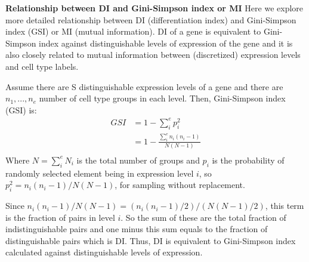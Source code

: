 \textbf{Relationship between DI and Gini-Simpson index or MI} 
Here we explore more detailed relationship between DI (differentiation index) and Gini-Simpson index (GSI) or MI (mutual information). DI of a gene is equivalent to Gini-Simpson index against distinguishable levels of expression of the gene and it is also closely related to mutual information between (discretized) expression levels and cell type labels. 

Assume there are S distinguishable expression levels of a gene and there are $n_1,...,n_e$ number of cell type groups in each level. Then, Gini-Simpson index (GSI) is:
\begin{align}
GSI &= 1 - \sum_{i}^{e}{p_{i}^2} \\
    &= 1 - \frac{\sum_{i}^{e}{n_i(n_i-1)}}{N(N-1)} \\
\end{align}
Where $N=\sum_{i}^{e}{N_i}$ is the total number of groups and $p_{i}$ is the probability of randomly selected element being in expression level $i$, so $p_{i}^2=n_i(n_i-1)/N(N-1)$, for sampling without replacement. 

Since $n_i(n_i-1)/N(N-1)=(n_i(n_i-1)/2)/(N(N-1)/2)$, this term is the fraction of pairs in level $i$. So the sum of these are the total fraction of indistinguishable pairs and one minus this sum equals to the fraction of distinguishable pairs which is DI. Thus, DI is equivalent to Gini-Simpson index calculated against distinguishable levels of expression.

